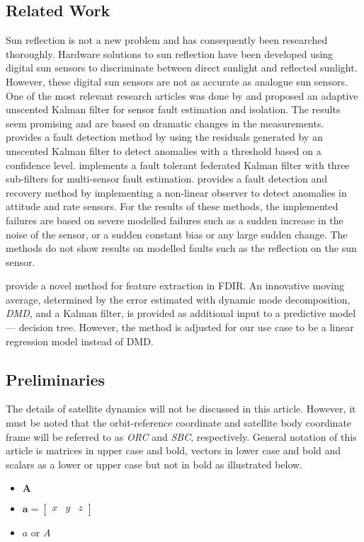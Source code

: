\documentclass[letterpaper, 10 pt, conference]{ieeeconf}  %
\begin{document}
\subsection{Related Work}
Sun reflection is not a new problem and has consequently been researched thoroughly. Hardware solutions to sun reflection have been developed using digital sun sensors to discriminate between direct sunlight and reflected sunlight. However, these digital sun sensors are not as accurate as analogue sun sensors. One of the most relevant research articles was done by \textcite{wang2019adaptive} and proposed an adaptive unscented Kalman filter for sensor fault estimation and isolation. The results seem promising and are based on dramatic changes in the measurements. \textcite{Xiong2007} provides a fault detection method by using the residuals generated by an unscented Kalman filter to detect anomalies with a threshold based on a confidence level. \textcite{Zhou2016} implements a fault tolerant federated Kalman filter with three sub-filters for multi-sensor fault estimation. \textcite{Nasrolahi2018} provides a fault detection and recovery method by implementing a non-linear observer to detect anomalies in attitude and rate sensors. For the results of these methods, the implemented failures are based on severe modelled failures such as a sudden increase in the noise of the sensor, or a sudden constant bias or any large sudden change. The methods do not show results on modelled faults such as the reflection on the sun sensor. 

\textcite{DeSilva2020} provide a novel method for feature extraction in FDIR. An innovative moving average, determined by the error estimated with dynamic mode decomposition, \emph{DMD}, and a Kalman filter, is provided as additional input to a predictive model --- decision tree. However, the method is adjusted for our use case to be a linear regression model instead of DMD.

\subsection{Preliminaries}
The details of satellite dynamics will not be discussed in this article. However, it must be noted that the orbit-reference coordinate and satellite body coordinate frame will be referred to as \emph{ORC} and \emph{SBC}, respectively. General notation of this article is matrices in upper case and bold, vectors in lower case and bold and scalars as a lower or upper case but not in bold as illustrated below.
\begin{itemize}
	\item{ $\mathbf{A}$}
	\item{ $\mathbf{a} = \begin{bmatrix} 
		x & y & z
		\end{bmatrix}$}
	\item{ $a$ or $A$}
\end{itemize}
\end{document}
